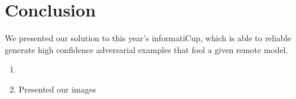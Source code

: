 \section{Conclusion}

We presented our solution to this year's informatiCup, which is able to reliable generate high confidence adversarial examples that fool a given remote model.



\begin{enumerate}
\item 
\item Presented our images
\end{enumerate}